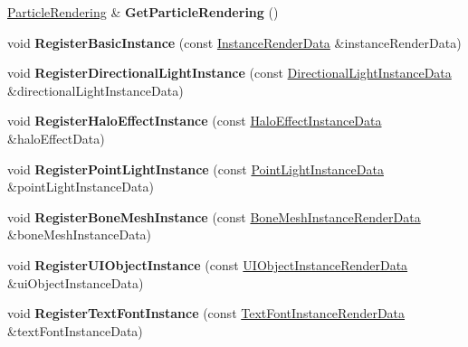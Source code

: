\begin{DoxyCompactItemize}
\mbox{\label{classAppRenderer_a0e5afe33f9a99df3c7b546710d20aa45}} 
\hyperlink{classParticleRendering}{Particle\+Rendering} \& {\bfseries Get\+Particle\+Rendering} ()
\item 
\mbox{\label{classAppRenderer_af7ca20884c77f5d17a59835742611803}} 
void {\bfseries Register\+Basic\+Instance} (const \hyperlink{structInstanceRenderData}{Instance\+Render\+Data} \&instance\+Render\+Data)
\item 
\mbox{\label{classAppRenderer_ab12a770688fb1d142c6701acebfdd6b4}} 
void {\bfseries Register\+Directional\+Light\+Instance} (const \hyperlink{structDirectionalLightInstanceData}{Directional\+Light\+Instance\+Data} \&directional\+Light\+Instance\+Data)
\item 
\mbox{\label{classAppRenderer_a8dcf762bbcbdce2de5e3f0a8810ab5dc}} 
void {\bfseries Register\+Halo\+Effect\+Instance} (const \hyperlink{structHaloEffectInstanceData}{Halo\+Effect\+Instance\+Data} \&halo\+Effect\+Data)
\item 
\mbox{\label{classAppRenderer_a214f01562badba6e4f10038a239917f8}} 
void {\bfseries Register\+Point\+Light\+Instance} (const \hyperlink{structPointLightInstanceData}{Point\+Light\+Instance\+Data} \&point\+Light\+Instance\+Data)
\item 
\mbox{\label{classAppRenderer_a28300e8e65298f09dff5d469dea3f85c}} 
void {\bfseries Register\+Bone\+Mesh\+Instance} (const \hyperlink{structBoneMeshInstanceRenderData}{Bone\+Mesh\+Instance\+Render\+Data} \&bone\+Mesh\+Instance\+Data)
\item 
\mbox{\label{classAppRenderer_ac80c3259382af5a0bd7163132da9c718}} 
void {\bfseries Register\+U\+I\+Object\+Instance} (const \hyperlink{structUIObjectInstanceRenderData}{U\+I\+Object\+Instance\+Render\+Data} \&ui\+Object\+Instance\+Data)
\item 
\mbox{\label{classAppRenderer_aaca975e8c6b1ac11095591926d942e4c}} 
void {\bfseries Register\+Text\+Font\+Instance} (const \hyperlink{structTextFontInstanceRenderData}{Text\+Font\+Instance\+Render\+Data} \&text\+Font\+Instance\+Data)

\end{DoxyCompactItemize}
